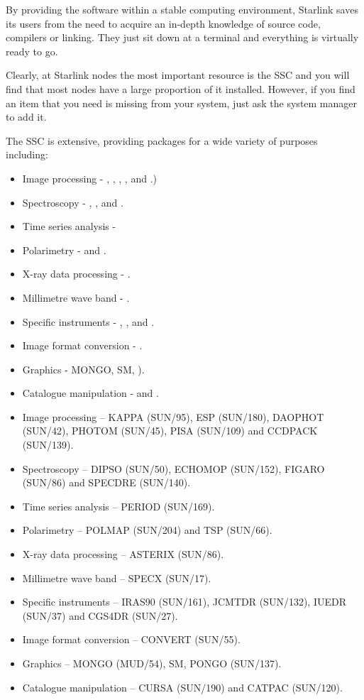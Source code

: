 By providing the software within a stable computing environment,
Starlink saves its users from the need to 
acquire an in-depth knowledge of source code, compilers or linking. They
just sit down at a terminal and everything is virtually ready to go.

Clearly, at Starlink nodes the most important resource is the SSC
and you will find that most nodes have a large proportion of it installed. 
However, if you find an item that you need is missing from your system,
just ask the system manager to add it. 

The SSC is extensive, providing packages for a wide variety of purposes 
including:

\begin{htmlonly}
\begin{itemize}
\item Image processing - {\KAPPAref}, {\ESPref}, {\DAOPHOTref}, {\PHOTOMref}, {\PISAref} and {\CCDPACKref}.) 
\item Spectroscopy - {\DIPSOref}, {\ECHOMOPref}, {\FIGAROref} and 
      {\SPECDREref}.
\item Time series analysis - {\PERIODref}
\item Polarimetry - {\POLMAPref} and {\TSPref}.
\item X-ray data processing - {\ASTERIXref}.
\item Millimetre wave band - {\SPECXref}.
\item Specific instruments - {\IRASref}, {\JCMTDRref}, {\IUEDRref} and {\CGSDRref}.
\item Image format conversion - {\CONVERTref}.
\item Graphics - MONGO, SM, {\PONGOref}). 
\item Catalogue manipulation - {\CATPACref} and {\CURSAref}.
\end{itemize}
\end{htmlonly}
\begin{latexonly}
\begin{itemize}
\item Image processing -- KAPPA (SUN/95), ESP (SUN/180), DAOPHOT (SUN/42), 
      PHOTOM (SUN/45), PISA (SUN/109) and CCDPACK (SUN/139). 
\item Spectroscopy -- DIPSO (SUN/50), ECHOMOP (SUN/152), FIGARO (SUN/86) and SPECDRE (SUN/140).
\item Time series analysis -- PERIOD (SUN/169).
\item Polarimetry -- POLMAP (SUN/204) and TSP (SUN/66).
\item X-ray data processing -- ASTERIX (SUN/86).
\item Millimetre wave band -- SPECX (SUN/17).
\item Specific instruments -- IRAS90 (SUN/161), JCMTDR (SUN/132), IUEDR (SUN/37) and CGS4DR (SUN/27).
\item Image format conversion -- CONVERT (SUN/55).
\item Graphics -- MONGO (MUD/54), SM, PONGO (SUN/137). 
\item Catalogue manipulation -- CURSA (SUN/190) and CATPAC (SUN/120).
\end{itemize}
\end{latexonly}

